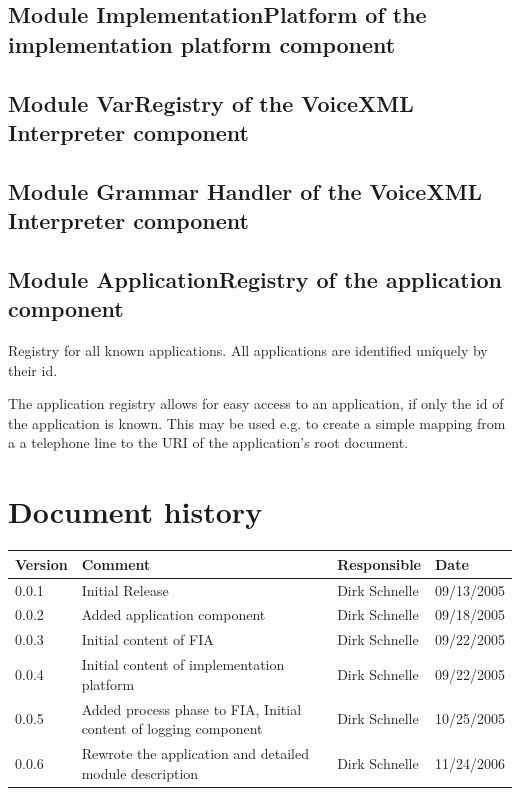 \documentclass[11pt,a4paper]{article}
\begin{document}
\subsection{Module ImplementationPlatform of the implementation platform 
component}


\subsection{Module VarRegistry of the VoiceXML Interpreter component}
\label{sec:module-varr-voic}

\subsection{Module Grammar Handler of the 
VoiceXML Interpreter component}

\subsection{Module ApplicationRegistry of the application component}

Registry for all known applications. All applications are identified
uniquely by their id.

The application registry allows for easy access to an application,
if only the id of the application is known. This may be used e.g. to
create a simple mapping from a a telephone line to the URI of the
application's root document.


\section*{Document history}

\begin{tabular}{|l|p{5cm}|l|l|}
\hline
\textbf{Version} & \textbf{Comment} & \textbf{Responsible} & \textbf{Date} \\
\hline
\hline
0.0.1 & Initial Release & Dirk Schnelle & 09/13/2005 \\
\hline
0.0.2 & Added application component & Dirk Schnelle & 09/18/2005 \\
\hline
0.0.3 & Initial content of FIA & Dirk Schnelle & 09/22/2005 \\
\hline
0.0.4 & Initial content of implementation platform & Dirk Schnelle & 09/22/2005 \\
\hline
0.0.5 & Added process phase to FIA, Initial content of logging component & 
Dirk Schnelle & 10/25/2005 \\
\hline
0.0.6 & Rewrote the application and detailed module description & 
Dirk Schnelle & 11/24/2006 \\
\hline
\end{tabular}



\end{document}
